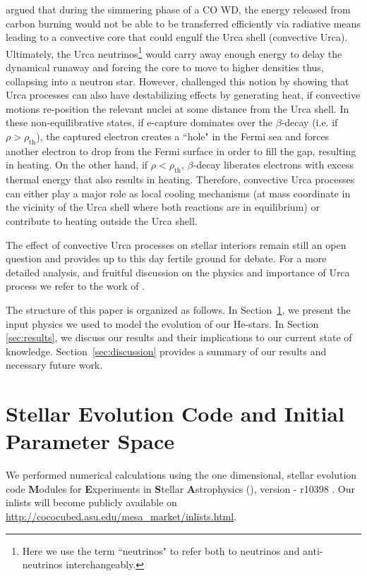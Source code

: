 \documentclass[../../main/thesis_msc.tex]{subfiles}
\begin{document}
\cite{Paczy1972} argued that during the simmering phase of a CO WD, the energy released from carbon burning would not be able to be transferred efficiently via radiative means leading to a convective core that could engulf the Urca shell (convective Urca). Ultimately, the Urca neutrinos\footnote{Here we use the term ``neutrinos" to refer both to neutrinos and anti-neutrinos interchangeably.} would carry away enough energy to delay the dynamical runaway and forcing the core to move to higher densities thus, collapsing into a neutron star. However, \cite{Bruenn1973} challenged this notion by showing that Urca processes can also have destabilizing effects by generating heat, if convective motions re-position the relevant nuclei at some distance from the Urca shell. In these non-equilibrative states, if e-capture dominates over the $\beta$-decay (i.e. if $\rho > \rho_{\text{th}}$), the captured electron creates a ``hole" in the Fermi sea and forces another electron to drop from the Fermi surface in order to fill the gap, resulting in heating. On the other hand, if $\rho < \rho_{\text{th}}$, $\beta$-decay liberates electrons with excess thermal energy that also results in heating. Therefore, convective Urca processes can either play a major role as local cooling mechanisms (at mass coordinate in the vicinity of the Urca shell where both reactions are in equilibrium) or contribute to heating outside the Urca shell.

The effect of convective Urca processes on stellar interiors remain still an open question and provides up to this day fertile ground for debate. For a more detailed analysis, and fruitful discussion on the physics and importance of Urca process we refer to the work of \cite{Paczy1973, Barkat1990, Ritossa1999, Stein1999, Lesaffre2005, Waldman2007, Denisseknkov2015, Schwab:2017epw}.

The structure of this paper is organized as follows. In Section\, \ref{sec:methods}, we present the input physics we used to model the evolution of our He-stars. In Section\, \ref{sec:results}, we discuss our results and their implications to our current state of knowledge. Section\, \ref{sec:discussion} provides a summary of our results and necessary future work.



\section{Stellar Evolution Code and Initial Parameter Space} \label{sec:methods}
We performed numerical calculations using the one dimensional, stellar evolution code \textbf{M}odules for \textbf{E}xperiments in \textbf{S}tellar \textbf{A}strophysics (\mesa), version - r10398 \citep{Paxton2011, Paxton:2013pj, Paxton2015, Paxton2018, Paxton2019}. Our \mesa inlists will become publicly available on \url{http://cococubed.asu.edu/mesa_market/inlists.html}.
\end{document}
